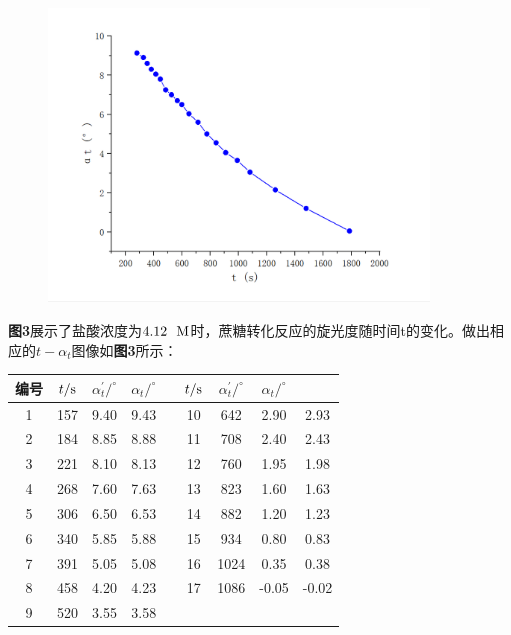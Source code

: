 \documentclass[12pt]{article}
\begin{document}
			\begin{figure}[!h]
				\centering
				\includegraphics[width=0.90\textwidth]{2.png}
			\end{figure}
			\par
			\textbf{图3}展示了盐酸浓度为$4.12\ \ {\rm M}$时，蔗糖转化反应的旋光度随时间t的变化。做出相应的$t-\alpha_{t}$图像如\textbf{图3}所示：\par
			\begin{table}[!h]
				\centering
				\begin{tabular}{ccccccccc}
					\toprule
					编号 & $t/{\rm s}$ & $\alpha^{\prime}_{t}/^{\circ}$ & $\alpha_{t}/^{\circ}$&& $t/{\rm s}$ & $\alpha^{\prime}_{t}/^{\circ}$ & $\alpha_{t}/^{\circ}$\\
					\midrule
					1 & 157 & 9.40 & 9.43 &  & 10 & 642  & 2.90  & 2.93  \\
					2 & 184 & 8.85 & 8.88 &  & 11 & 708  & 2.40  & 2.43  \\
					3 & 221 & 8.10 & 8.13 &  & 12 & 760  & 1.95  & 1.98  \\
					4 & 268 & 7.60 & 7.63 &  & 13 & 823  & 1.60  & 1.63  \\
					5 & 306 & 6.50 & 6.53 &  & 14 & 882  & 1.20  & 1.23  \\
					6 & 340 & 5.85 & 5.88 &  & 15 & 934  & 0.80  & 0.83  \\
					7 & 391 & 5.05 & 5.08 &  & 16 & 1024 & 0.35  & 0.38  \\
					8 & 458 & 4.20 & 4.23 &  & 17 & 1086 & -0.05 & -0.02 \\
					9 & 520 & 3.55 & 3.58 &  &    &      &       &       \\
					\bottomrule
				\end{tabular}
			\end{table}
\end{document}
